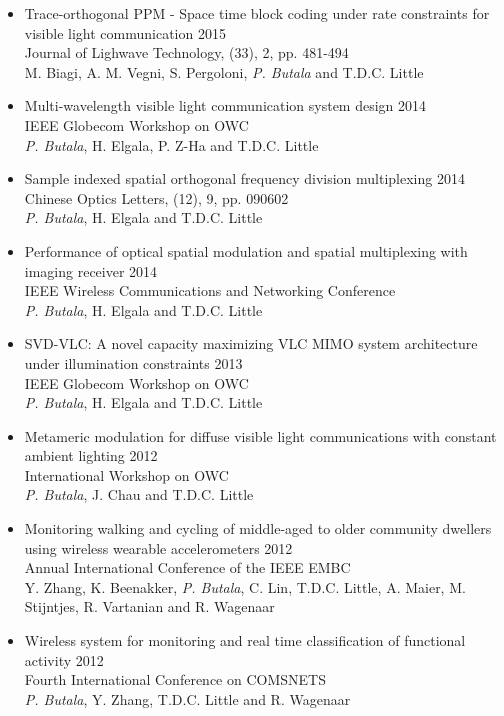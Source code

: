 \begin{itemize}[topsep=0.5em,leftmargin=1.25em]
	\item Trace-orthogonal PPM - Space time block coding under rate constraints for visible light communication \hfill 2015 \\
	Journal of Lighwave Technology, (33), 2, pp. 481-494\\
	M. Biagi, A. M. Vegni, S. Pergoloni, \textit{P. Butala} and T.D.C. Little
	\item Multi-wavelength visible light communication system design \hfill 2014\\ 
	IEEE Globecom Workshop on OWC\\
	\textit{P. Butala},  H. Elgala, P. Z-Ha and T.D.C. Little
	\item Sample indexed spatial orthogonal frequency division multiplexing \hfill 2014\\ 
	Chinese Optics Letters, (12), 9, pp. 090602\\
	\textit{P. Butala}, H. Elgala and T.D.C. Little
	\item Performance of optical spatial modulation and spatial multiplexing with imaging receiver \hfill 2014\\
	IEEE Wireless Communications and Networking Conference\\
	\textit{P. Butala}, H. Elgala and T.D.C. Little
	\item SVD-VLC: A novel capacity maximizing VLC MIMO system architecture under illumination constraints \hfill 2013\\
	IEEE Globecom Workshop on OWC\\
	\textit{P. Butala}, H. Elgala and T.D.C. Little
	\item Metameric modulation for diffuse visible light communications with constant ambient lighting \hfill 2012\\
	International Workshop on OWC\\
	\textit{P. Butala}, J. Chau and T.D.C. Little
	\item Monitoring walking and cycling of middle-aged to older community dwellers using wireless wearable accelerometers \hfill 2012\\
	Annual International Conference of the IEEE EMBC\\
	Y. Zhang, K. Beenakker, \textit{P. Butala}, C. Lin, T.D.C. Little, A. Maier, M. Stijntjes, R. Vartanian and R. Wagenaar
	\item Wireless system for monitoring and real time classification of functional activity \hfill 2012\\
	Fourth International Conference on COMSNETS\\
	\textit{P. Butala}, Y. Zhang, T.D.C. Little and R. Wagenaar
\end{itemize}
